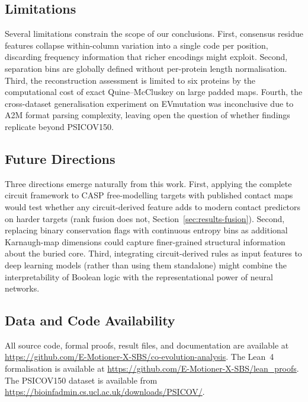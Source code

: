 \subsection{Limitations}
Several limitations constrain the scope of our conclusions.  First, consensus
residue features collapse within-column variation into a single code per
position, discarding frequency information that richer encodings might
exploit.  Second, separation bins are globally defined without per-protein
length normalisation.  Third, the reconstruction assessment is limited to six
proteins by the computational cost of exact Quine--McCluskey on large padded
maps.  Fourth, the cross-dataset generalisation experiment on EVmutation was
inconclusive due to A2M format parsing complexity, leaving open the question
of whether findings replicate beyond PSICOV150.

\subsection{Future Directions}
Three directions emerge naturally from this work.  First, applying the complete
circuit framework to CASP free-modelling targets with published contact maps
would test whether any circuit-derived feature adds to modern contact
predictors on harder targets (rank fusion does not, Section~\ref{sec:results-fusion}).
Second, replacing binary conservation flags with continuous entropy bins as
additional Karnaugh-map dimensions could capture finer-grained structural
information about the buried core.  Third, integrating circuit-derived rules
as input features to deep learning models (rather than using them standalone)
might combine the interpretability of Boolean logic with the representational
power of neural networks.

\subsection{Data and Code Availability}
All source code, formal proofs, result files, and documentation are available
at \url{https://github.com/E-Motioner-X-SBS/co-evolution-analysis}.  The Lean~4
formalisation is available at \url{https://github.com/E-Motioner-X-SBS/lean_proofs}.
The PSICOV150 dataset is available from \url{https://bioinfadmin.cs.ucl.ac.uk/downloads/PSICOV/}.
